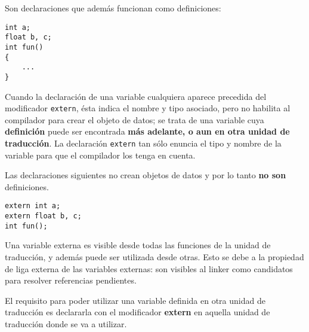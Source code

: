 \begin{ejemplo}
Son declaraciones que además funcionan como definiciones:
\begin{lstlisting}
int a;
float b, c;
int fun() 
{
	...
}
\end{lstlisting}
\end{ejemplo}


Cuando la declaración de una variable cualquiera aparece precedida del modificador \texttt{extern}, ésta indica el nombre y tipo asociado, pero no habilita al compilador para crear el objeto de datos; se trata de una variable cuya \textbf{definición} puede ser encontrada
\textbf{más adelante, o aun en otra unidad de traducción}. La declaración \texttt{extern} tan sólo enuncia el tipo y nombre de la variable para que el compilador los tenga en cuenta.

\begin{ejemplo}
Las declaraciones siguientes no crean objetos de datos y por lo tanto \textbf{no son} definiciones.
\begin{lstlisting}
extern int a;
extern float b, c;
int fun();
\end{lstlisting}
\end{ejemplo}

Una variable externa es visible desde todas las funciones de la unidad de traducción, y además puede ser
utilizada desde otras. Esto se debe a la propiedad de liga externa de las variables externas: son visibles
al linker como candidatos para resolver referencias pendientes.

El requisito para poder utilizar una variable definida en otra unidad de traducción es declararla con el
modificador \textbf{extern} en aquella unidad de traducción donde se va a utilizar.


